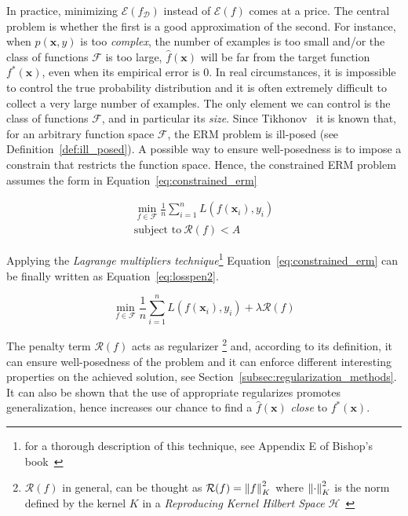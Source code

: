 In practice, minimizing $\mathcal{E}(f_{\mathcal{D}})$ instead of $\mathcal{E}(f)$ comes at a price. The central problem is whether the first is a good approximation of the second. For instance, when $p(\bm{x}, y)$ is too \textit{complex}, the number of examples is too small and/or the class of functions $\mathcal{F}$ is too large, $\hat f(\bm{x})$ will be far from the target function $f^*(\bm{x})$, even when its empirical error is $0$. In real circumstances, it is impossible to control the true probability distribution and it is often extremely difficult to collect a very large number of examples. The only element we can control is the class of functions $\mathcal{F}$, and in particular its \textit{size}. Since Tikhonov~\cite{tikhonov1963solution} it is known that, for an arbitrary function space $\mathcal{F}$, the ERM problem is ill-posed (see Definition~\ref{def:ill_posed}). A possible way to ensure well-posedness is to impose a constrain that restricts the function space. Hence, the constrained ERM problem assumes the form in Equation~\eqref{eq:constrained_erm}

\begin{equation} \label{eq:constrained_erm}
	\begin{aligned}
		\min_{f \in \mathcal{F}}{\frac{1}{n} \sum_{i=1}^{n} L(f(\bm{x}_i), y_i)} \\
		\text{subject to}~\mathcal{R}(f) < A
	\end{aligned}
\end{equation}

Applying the \textit{Lagrange multipliers technique}\footnote{for a thorough description of this technique, see Appendix E of Bishop's book~\cite{bishop2006pattern}} Equation~\eqref{eq:constrained_erm} can be finally written as Equation~\eqref{eq:losspen2}.

\begin{equation} \label{eq:losspen2}
	\min_{f \in \mathcal{F}}{\frac{1}{n} \sum_{i=1}^{n} L(f(\bm{x}_i), y_i)} + \lambda \mathcal{R}(f)
\end{equation}

The penalty term $\mathcal{R}(f)$ acts as regularizer \footnote{$\mathcal{R}(f)$ in general, can be thought as $\mathcal{R}(f) = \left\lVert f\right\rVert^2_K$ where $\left\lVert\cdot\right\rVert^2_K$ is the norm defined by the kernel $K$ in a \textit{Reproducing Kernel Hilbert Space} $\mathcal{H}$~\cite{evgeniou2000regularization}}
and, according to its definition, it can ensure well-posedness of the problem and it can enforce different interesting properties on the achieved solution, see Section~\ref{subsec:regularization_methods}. It can also be shown that the use of appropriate regularizes promotes generalization, hence increases our chance to find a $\hat f(\bm{x})$ \textit{close} to $f^*(\bm{x})$.

